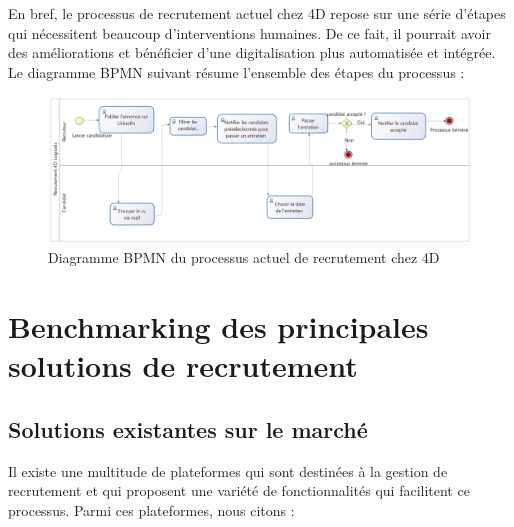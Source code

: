 En bref, le processus de recrutement actuel chez 4D repose sur une série d’étapes qui
nécessitent beaucoup d’interventions humaines. De ce fait, il pourrait avoir des améliorations et bénéficier d’une digitalisation plus automatisée et intégrée. Le diagramme BPMN
suivant résume l’ensemble des étapes du processus :

\begin{figure}[h]
   \centering
   \includegraphics[scale=0.3]{Images/BPMN1.png} 
   \caption{Diagramme BPMN du processus actuel de recrutement chez 4D}
   \label{fig:BPMN1}
\end{figure}





\section{Benchmarking des principales solutions de recrutement}
\subsection{Solutions existantes sur le marché}

Il existe une multitude de plateformes qui sont destinées à la gestion de recrutement
et qui proposent une variété de fonctionnalités qui facilitent ce processus. Parmi ces plateformes, nous citons :


